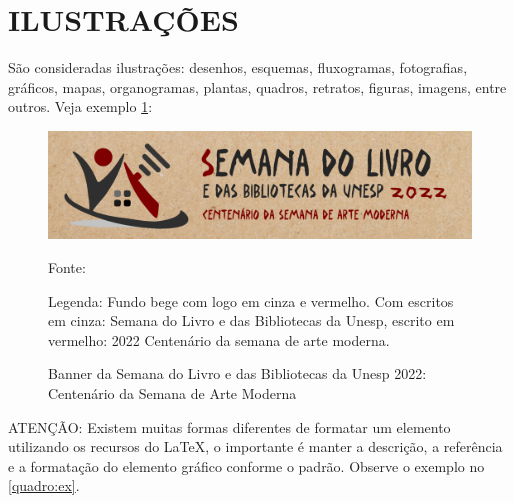 
\section{ILUSTRAÇÕES}

São consideradas ilustrações: desenhos, esquemas, fluxogramas, fotografias, gráficos, mapas, organogramas, plantas, quadros, retratos, figuras, imagens, entre outros. Veja exemplo \ref{figura:ex}:
\begin{figure}[h]
	\centering
	\caption{Banner da Semana do Livro e das Bibliotecas da Unesp 2022: Centenário da Semana de Arte Moderna }
	\includegraphics[width=1.0\linewidth,scale=1.0]{images/banner-semana.png}
	\par
	\raggedright
	{\small Fonte: }
	\par
	{\small Legenda: Fundo bege com logo em cinza e vermelho. Com escritos em cinza: Semana do Livro e das Bibliotecas da Unesp, escrito em vermelho: 2022 Centenário da semana de arte moderna. }
	\label{figura:ex}
\end{figure}

ATENÇÃO: Existem muitas formas diferentes de formatar um elemento utilizando os recursos do \LaTeX, o importante é manter a descrição, a referência e a formatação do elemento gráfico conforme o padrão. Observe o exemplo no \ref{quadro:ex}.


